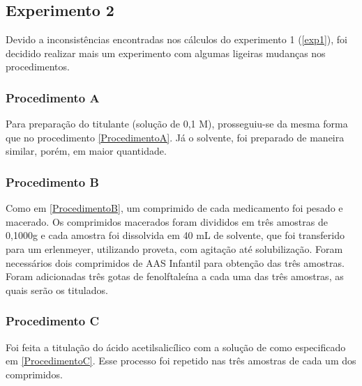      \subsection{Experimento 2}\label{exp2}

     Devido a inconsistências encontradas nos cálculos do experimento 1 (\ref{exp1}), foi decidido realizar 
     mais um experimento com algumas ligeiras mudanças nos procedimentos.
     
     \subsubsection{Procedimento A}\label{ProcedimentoA2}

     Para preparação do titulante (solução de  0,1 M), prosseguiu-se da mesma forma que no procedimento
     \ref{ProcedimentoA}. Já o solvente, foi preparado de maneira similar, porém, em maior quantidade.

     \subsubsection{Procedimento B}\label{ProcedimentoB2}

     Como em \ref{ProcedimentoB}, um comprimido de cada medicamento foi pesado e macerado. Os comprimidos 
     macerados foram divididos em três amostras de 0,1000g e cada amostra foi dissolvida em 40 mL de 
     solvente, que foi transferido para um erlenmeyer, utilizando proveta, com agitação até solubilização. 
     Foram necessários dois comprimidos de AAS Infantil para obtenção das três amostras.
     Foram adicionadas três gotas de fenolftaleína a cada uma das três amostras, as quais serão os titulados.

     \subsubsection{Procedimento C}\label{ProcedimentoC2}

     Foi feita a titulação do ácido acetilsalicílico com a solução de  como especificado 
     em \ref{ProcedimentoC}. Esse processo foi repetido nas três amostras de cada um dos comprimidos.

